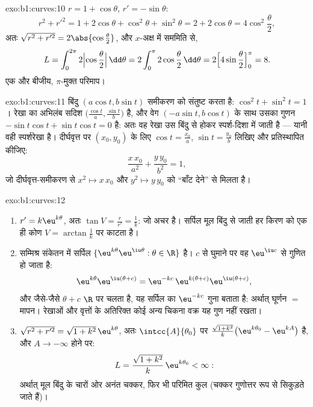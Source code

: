 \begin{solution}{exo:b1:curves:10}
$r = 1 + \cos\theta$, $r' = -\sin\theta$:
\[
r^2 + r'^2 = 1 + 2\cos\theta + \cos^2\theta + \sin^2\theta
= 2 + 2\cos\theta = 4\cos^2\frac\theta2 ,
\]
अतः $\sqrt{r^2 + r'^2} = 2\abs{\cos\frac\theta2}$, और $x$-अक्ष में सममिति
से,
\[
L = \int_0^{2\pi} 2\Bigl|\cos\frac\theta2\Bigr|\,\dd\theta
= 2\int_0^{\pi} 2\cos\frac\theta2\,\dd\theta
= 2\Bigl[4\sin\frac\theta2\Bigr]_0^{\pi} = 8 .
\]
एक और बीजीय, $\pi$-मुक्त परिमाप।
\end{solution}

\begin{solution}{exo:b1:curves:11}
बिंदु $(a\cos t, b\sin t)$ समीकरण को संतुष्ट करता है: $\cos^2 t + \sin^2 t =
1$। रेखा का अभिलंब सदिश $\bigl(\frac{\cos t}a, \frac{\sin t}b\bigr)$ है, और
वेग $(-a\sin t, b\cos t)$ के साथ उसका गुणन $-\sin t\cos t + \sin t\cos t =
0$ है: अतः वह रेखा उस बिंदु से होकर स्पर्श-दिशा में जाती है --- यानी वही
स्पर्शरेखा है। दीर्घवृत्त पर $(x_0, y_0)$ के लिए $\cos t = \frac{x_0}a$,
$\sin t = \frac{y_0}b$ लिखिए और प्रतिस्थापित कीजिए:
\[
\frac{x\,x_0}{a^2} + \frac{y\,y_0}{b^2} = 1 ,
\]
जो दीर्घवृत्त-समीकरण से $x^2 \mapsto x\,x_0$ और $y^2 \mapsto y\,y_0$ को
``बाँट देने'' से मिलता है।
\end{solution}

\begin{solution}{exo:b1:curves:12}
\begin{enumerate}
  \item $r' = k\eu^{k\theta}$, अतः $\tan V = \frac{r}{r'} = \frac1k$: जो अचर
  है। सर्पिल मूल बिंदु से जाती हर किरण को एक ही कोण $V = \arctan\frac1k$ पर
  काटता है।
  \item सम्मिश्र संकेतन में सर्पिल $\{\eu^{k\theta} \eu^{\iu\theta} : \theta
  \in \R\}$ है। $c$ से घुमाने पर वह $\eu^{\iu c}$ से गुणित हो जाता है:
        \[
        \eu^{k\theta}\eu^{\iu(\theta + c)}
        = \eu^{-kc}\,\eu^{k(\theta + c)}\eu^{\iu(\theta+c)} ,
        \]
        और जैसे-जैसे $\theta + c$ $\R$ पर चलता है, यह सर्पिल का $\eu^{-kc}$
        गुना बताता है: अर्थात् घूर्णन $=$ मापन। रेखाओं और वृत्तों के
        अतिरिक्त कोई अन्य चिकना वक्र यह गुण नहीं रखता।
  \item $\sqrt{r^2 + r'^2} = \sqrt{1 + k^2}\,\eu^{k\theta}$, अतः
  $\intcc{A}{\theta_0}$ पर 
  $\frac{\sqrt{1+k^2}}{k}\bigl(\eu^{k\theta_0} - \eu^{kA}\bigr)$ है, और $A
  \to -\infty$ होने पर:
        \[
        L = \frac{\sqrt{1 + k^2}}{k}\,\eu^{k\theta_0} < \infty :
        \]
        अर्थात् मूल बिंदु के चारों ओर अनंत चक्कर, फिर भी परिमित कुल 
        (चक्कर गुणोत्तर रूप से सिकुड़ते जाते हैं)।
\end{enumerate}
\end{solution}

